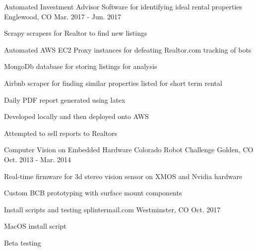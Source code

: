 \begin{cventries}
  \cventry
    {Automated Investment Advisor}
    {Software for identifying ideal rental properties}
    {Englewood, CO} %
    {Mar. 2017 - Jun. 2017} %
    {
      \begin{cvitems} %
        \item {Scrapy scrapers for Realtor to find new listings}
        \item {Automated AWS EC2 Proxy instances for defeating Realtor.com tracking of bots}
        \item {MongoDb database for storing listings for analysis}
        \item {Airbnb scraper for finding similar properties listed for short term rental}
        \item {Daily PDF report generated using latex}
        \item {Developed locally and then deployed onto AWS}
        \item {Attempted to sell reports to Realtors}
      \end{cvitems}
    }


  \cventry
    {Computer Vision on Embedded Hardware}
    {Colorado Robot Challenge}
    {Golden, CO} %
    {Oct. 2013 - Mar. 2014} %
    {
      \begin{cvitems} %
        \item {Real-time firmware for 3d stereo vision sensor on XMOS and Nvidia hardware}
        \item {Custom BCB prototyping with surface mount components}
      \end{cvitems}
    }

  \cventry
    {Install scripts and testing}
    {splintermail.com}
    {Westminster, CO} %
    {Oct. 2017} %
    {
      \begin{cvitems} %
        \item {MacOS install script}
        \item {Beta testing}
      \end{cvitems}
    }

\end{cventries}
